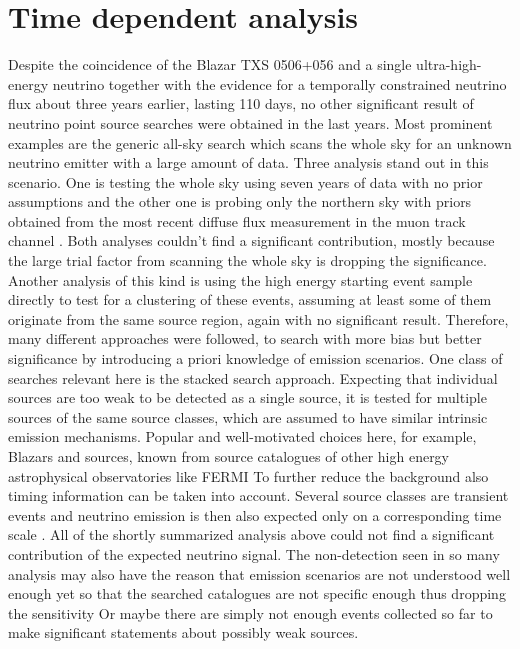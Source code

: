 \chapter{Time dependent analysis}

Despite the coincidence of the Blazar TXS 0506+056 and a single ultra-high-energy neutrino together with the evidence for a temporally constrained neutrino flux about three years earlier, lasting 110 days, no other significant result of neutrino point source searches were obtained in the last years.
Most prominent examples are the generic all-sky search which scans the whole sky for an unknown neutrino emitter with a large amount of data.
Three analysis stand out in this scenario.
One is testing the whole sky using seven years of data with no prior assumptions  and the other one is probing only the northern sky with priors obtained from the most recent diffuse flux measurement in the muon track channel .
Both analyses couldn't find a significant contribution, mostly because the large trial factor from scanning the whole sky is dropping the significance.
Another analysis of this kind is using the high energy starting event sample directly to test for a clustering of these events, assuming at least some of them originate from the same source region, again with no significant result.
Therefore, many different approaches were followed, to search with more bias but better significance by introducing a priori knowledge of emission scenarios.
One class of searches relevant here is the stacked search approach.
Expecting that individual sources are too weak to be detected as a single source, it is tested for multiple sources of the same source classes, which are assumed to have similar intrinsic emission mechanisms.
Popular and well-motivated choices here, for example, Blazars and sources, known from source catalogues of other high energy astrophysical observatories like FERMI 
To further reduce the background also timing information can be taken into account.
Several source classes are transient events and neutrino emission is then also expected only on a corresponding time scale .
All of the shortly summarized analysis above could not find a significant contribution of the expected neutrino signal.
The non-detection seen in so many analysis may also have the reason that emission scenarios are not understood well enough yet so that the searched catalogues are not specific enough thus dropping the sensitivity Or maybe there are simply not enough events collected so far to make significant statements about possibly weak sources.

